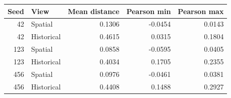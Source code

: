 \begingroup\color{revisionblue}
\sffamily\fontsize{9}{11}\selectfont\renewcommand{\arraystretch}{1.08}\setlength{\tabcolsep}{3pt}
\begin{tabular}{rlrrr}

\toprule
Seed & View & Mean distance & Pearson min & Pearson max \\
\midrule

42 & Spatial & 0.1306 & -0.0454 & 0.0143 \\

42 & Historical & 0.4615 & 0.0315 & 0.1804 \\

123 & Spatial & 0.0858 & -0.0595 & 0.0405 \\

123 & Historical & 0.4034 & 0.1705 & 0.2355 \\

456 & Spatial & 0.0976 & -0.0461 & 0.0381 \\

456 & Historical & 0.4408 & 0.1488 & 0.2927 \\

\bottomrule
\end{tabular}
\endgroup
